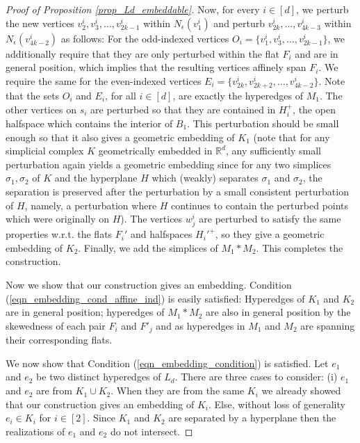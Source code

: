 \documentclass{article}
\newcommand{\RR}{\mathbb{R}}
\theoremstyle{definition}
\begin{document}
\begin{proof}[Proof of Proposition \ref{prop_Ld_embeddable}]
Now, for every $i\in [d]$, we perturb the new vertices $v_2^i, v_3^i, \dots, v_{2k-1}^i$ within $N_\epsilon(v_1^i)$ and perturb $v_{2k}^i, \dots, v_{4k-3}^i$ within $N_\epsilon(v_{4k-2}^i)$ as follows: 
For the odd-indexed vertices $O_i=\{v_1^i, v_3^i, \dots, v_{2k-1}^i\}$, we additionally require that they are only perturbed within the flat $F_i$ and are in general position, which implies that the resulting vertices affinely span $F_i$. We require the same for the even-indexed vertices $E_i=\{v_{2k}^i, v_{2k+2}^i, \dots, v_{4k-2}^i\}$. Note that the sets $O_i$ and $E_i$, for all $i\in [d]$,  are exactly the hyperedges of $M_1$. The other vertices on $s_i$ are perturbed so that they are contained in $H_i^+$, the open halfspace which contains the interior of $B_1$. This perturbation should be small enough so that it also gives a geometric embedding of $K_1$  (note that for any simplicial complex $K$ geometrically embedded in $\RR^d$, any sufficiently small perturbation again yields a geometric embedding since for any two simplices $\sigma_1, \sigma_2$ of $K$ and the hyperplane $H$ which (weakly) separates $\sigma_1$ and $\sigma_2$, the separation is preserved after the perturbation by a small consistent perturbation of $H$, namely, a perturbation where $H$ continues to contain the perturbed points which were originally on $H$). The vertices $w_j^i$ are perturbed to satisfy the same properties w.r.t. the flats $F_i'$ and halfspaces $H_i'^{+}$, so they give a geometric embedding of $K_2$. 
Finally, we add the simplices of $M_1*M_2$. This completes the construction.

\medskip

Now we show that our construction gives an embedding. Condition (\ref{eqn_embedding_cond_affine_ind}) is easily satisfied: Hyperedges of $K_1$ and $K_2$ are 
in general position; 
hyperedges of $M_1*M_2$ are also in general position
by the skewedness of each pair $F_i$ and $F'_j$ and as hyperedges in $M_1$ and $M_2$ are 
spanning their corresponding flats. 

\smallskip 

We now show that Condition (\ref{eqn_embedding_condition}) is satisfied. Let $e_1$ and $e_2$ be two distinct hyperedges of $L_d$. There are three cases to consider: (i) $e_1$ and $e_2$ are from $K_1\cup K_2$. When they are from the same $K_i$ we already showed that our construction gives an embedding of $K_i$. Else, without loss of generality $e_i\in K_i$ for $i\in [2]$. Since $K_1$ and $K_2$ are separated by a hyperplane then the realizations of $e_1$ and $e_2$ do not intersect.


\end{proof}
\end{document}
